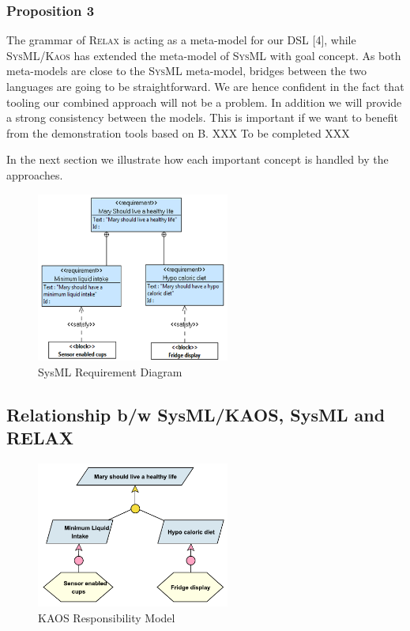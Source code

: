 \documentclass[10pt, conference, compsocconf]{IEEEtran}
\def\myrelax{\textsc{Relax}}                  %
\def\sysml{\textsc{SysML}}
\def\kaos{\textsc{Kaos}}
\begin{document}
\subsubsection*{Proposition 3}

The grammar of \myrelax{} is acting as a meta-model for our DSL [4], while \sysml{}/\kaos{} has extended the meta-model of \sysml{} with goal concept. As both meta-models are close to the \sysml{} meta-model, bridges between the two languages are going to be straightforward. We are hence confident in the fact that tooling our combined approach will not be a problem. In addition we will provide a strong consistency between the models. This is important if we want to benefit from the demonstration tools based on B. 
XXX To be completed XXX

In the next section we illustrate how each important concept is handled by the approaches.

\begin{figure}[!t]
\centering
\includegraphics[width=2.5in]{fig14}
\caption{SysML Requirement Diagram}
\label{fig:ReqDiag}
\end{figure}


\subsection{Relationship b/w SysML/KAOS, SysML and RELAX}

\begin{figure}[!t]
\centering
\includegraphics[width=2.5in]{fig12}
\caption{KAOS Responsibility Model}
\label{fig:KAOSModel}
\end{figure}
\end{document}
